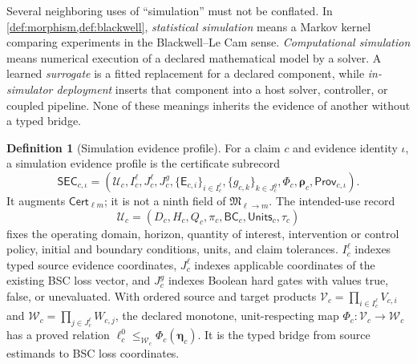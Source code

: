 \documentclass[11pt,a4paper]{article}
\theoremstyle{definition}
\newtheorem{definition}{Definition}[section]
\theoremstyle{plain}
\theoremstyle{remark}
\newcommand{\Cert}{\mathsf{Cert}}
\begin{document}
Several neighboring uses of ``simulation'' must not be conflated.  In
\cref{def:morphism,def:blackwell}, \emph{statistical simulation} means a
Markov kernel comparing experiments in the Blackwell--Le Cam sense.
\emph{Computational simulation} means numerical execution of a declared
mathematical model by a solver.  A learned \emph{surrogate} is a fitted
replacement for a declared component, while \emph{in-simulator deployment}
inserts that component into a host solver, controller, or coupled pipeline.
None of these meanings inherits the evidence of another without a typed
bridge.

\begin{definition}[Simulation evidence profile]\label{def:simprofile}
For a claim \(c\) and evidence identity \(\iota\), a simulation evidence
profile is the certificate subrecord
\[
\mathsf{SEC}_{c,\iota}
=
\left(
\mathcal U_c,I_c^\ell,J_c^\ell,J_c^g,
\{\mathsf E_{c,i}\}_{i\in I_c^\ell},
\{g_{c,k}\}_{k\in J_c^g},
\Phi_c,\boldsymbol\rho_c,\mathsf{Prov}_{c,\iota}
\right).
\]
It augments \(\Cert_{\ell m}\); it is not a ninth field of
\(\mathfrak M_{\ell\to m}\).  The intended-use record
\[
\mathcal U_c
=
(D_c,H_c,Q_c,\pi_c,\mathsf{BC}_c,\mathsf{Units}_c,\tau_c)
\]
fixes the operating domain, horizon, quantity of interest, intervention or
control policy, initial and boundary conditions, units, and claim
tolerances.  \(I_c^\ell\) indexes typed source evidence coordinates,
\(J_c^\ell\) indexes applicable coordinates of the existing BSC loss vector,
and \(J_c^g\) indexes Boolean hard gates with values true, false, or
unevaluated.  With ordered source and target products
\(\mathcal V_c=\prod_{i\in I_c^\ell}V_{c,i}\) and
\(\mathcal W_c=\prod_{j\in J_c^\ell}W_{c,j}\), the declared monotone,
unit-respecting map
\(\Phi_c:\mathcal V_c\to\mathcal W_c\) has a proved relation
\(\boldsymbol\ell_c^0\le_{\mathcal W_c}\Phi_c(\boldsymbol\eta_c)\).
It is the typed bridge from source estimands to BSC loss coordinates.


\end{definition}
\end{document}
